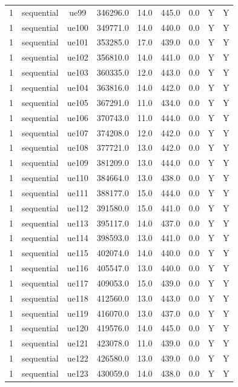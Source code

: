 \begin{table}[ht]
\begin{tabular}{|c|c|c|c|c|c|c|c|c|}
1 & sequential & ue99 & 346296.0 & 14.0 & 445.0 & 0.0 & Y & Y \\
1 & sequential & ue100 & 349771.0 & 14.0 & 440.0 & 0.0 & Y & Y \\
1 & sequential & ue101 & 353285.0 & 17.0 & 439.0 & 0.0 & Y & Y \\
1 & sequential & ue102 & 356810.0 & 14.0 & 441.0 & 0.0 & Y & Y \\
1 & sequential & ue103 & 360335.0 & 12.0 & 443.0 & 0.0 & Y & Y \\
1 & sequential & ue104 & 363816.0 & 14.0 & 442.0 & 0.0 & Y & Y \\
1 & sequential & ue105 & 367291.0 & 11.0 & 434.0 & 0.0 & Y & Y \\
1 & sequential & ue106 & 370743.0 & 11.0 & 444.0 & 0.0 & Y & Y \\
1 & sequential & ue107 & 374208.0 & 12.0 & 442.0 & 0.0 & Y & Y \\
1 & sequential & ue108 & 377721.0 & 13.0 & 442.0 & 0.0 & Y & Y \\
1 & sequential & ue109 & 381209.0 & 13.0 & 444.0 & 0.0 & Y & Y \\
1 & sequential & ue110 & 384664.0 & 13.0 & 438.0 & 0.0 & Y & Y \\
1 & sequential & ue111 & 388177.0 & 15.0 & 444.0 & 0.0 & Y & Y \\
1 & sequential & ue112 & 391580.0 & 15.0 & 441.0 & 0.0 & Y & Y \\
1 & sequential & ue113 & 395117.0 & 14.0 & 437.0 & 0.0 & Y & Y \\
1 & sequential & ue114 & 398593.0 & 13.0 & 441.0 & 0.0 & Y & Y \\
1 & sequential & ue115 & 402074.0 & 14.0 & 440.0 & 0.0 & Y & Y \\
1 & sequential & ue116 & 405547.0 & 13.0 & 440.0 & 0.0 & Y & Y \\
1 & sequential & ue117 & 409053.0 & 15.0 & 439.0 & 0.0 & Y & Y \\
1 & sequential & ue118 & 412560.0 & 13.0 & 443.0 & 0.0 & Y & Y \\
1 & sequential & ue119 & 416070.0 & 13.0 & 437.0 & 0.0 & Y & Y \\
1 & sequential & ue120 & 419576.0 & 14.0 & 445.0 & 0.0 & Y & Y \\
1 & sequential & ue121 & 423078.0 & 11.0 & 439.0 & 0.0 & Y & Y \\
1 & sequential & ue122 & 426580.0 & 13.0 & 439.0 & 0.0 & Y & Y \\
1 & sequential & ue123 & 430059.0 & 14.0 & 438.0 & 0.0 & Y & Y \\

\end{tabular}
\end{table}
